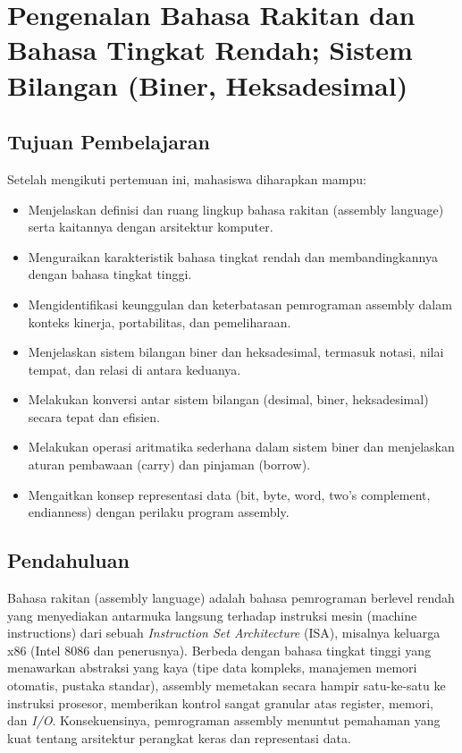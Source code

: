 \chapter{Pengenalan Bahasa Rakitan dan Bahasa Tingkat Rendah; Sistem Bilangan (Biner, Heksadesimal)}

\section{Tujuan Pembelajaran}
Setelah mengikuti pertemuan ini, mahasiswa diharapkan mampu:
\begin{itemize}
  \item Menjelaskan definisi dan ruang lingkup bahasa rakitan (assembly language) serta kaitannya dengan arsitektur komputer.
  \item Menguraikan karakteristik bahasa tingkat rendah dan membandingkannya dengan bahasa tingkat tinggi.
  \item Mengidentifikasi keunggulan dan keterbatasan pemrograman assembly dalam konteks kinerja, portabilitas, dan pemeliharaan.
  \item Menjelaskan sistem bilangan biner dan heksadesimal, termasuk notasi, nilai tempat, dan relasi di antara keduanya.
  \item Melakukan konversi antar sistem bilangan (desimal, biner, heksadesimal) secara tepat dan efisien.
  \item Melakukan operasi aritmatika sederhana dalam sistem biner dan menjelaskan aturan pembawaan (carry) dan pinjaman (borrow).
  \item Mengaitkan konsep representasi data (bit, byte, word, two's complement, endianness) dengan perilaku program assembly.
\end{itemize}

\section{Pendahuluan}
Bahasa rakitan (assembly language) adalah bahasa pemrograman berlevel rendah yang menyediakan antarmuka langsung terhadap instruksi mesin (machine instructions) dari sebuah \textit{Instruction Set Architecture} (ISA), misalnya keluarga x86 (Intel 8086 dan penerusnya). Berbeda dengan bahasa tingkat tinggi yang menawarkan abstraksi yang kaya (tipe data kompleks, manajemen memori otomatis, pustaka standar), assembly memetakan secara hampir satu-ke-satu ke instruksi prosesor, memberikan kontrol sangat granular atas register, memori, dan \textit{I/O}. Konsekuensinya, pemrograman assembly menuntut pemahaman yang kuat tentang arsitektur perangkat keras dan representasi data.

